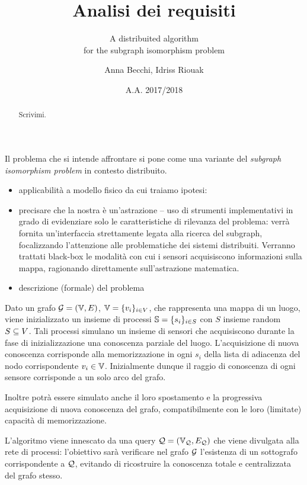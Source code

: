 \documentclass{llncs}
\subtitle{A distribuited algorithm\\for the subgraph isomorphism problem}
\title{Analisi dei requisiti}
\author{Anna Becchi, Idriss Riouak}
\institute{Laurea Magistrale in Informatica\\Universit\`a di Udine, Italy}
\date{A.A. 2017/2018}
\begin{document}
\maketitle
\begin{abstract}
  Scrivimi.
\end{abstract}

Il problema che si intende affrontare si pone come una variante del
\emph{subgraph isomorphism problem} in contesto distribuito.

\begin{itemize}
\item applicabilità a modello fisico da cui traiamo ipotesi:
\item precisare che la nostra è un'astrazione -- uso di strumenti
  implementativi in grado di evidenziare solo le caratteristiche
  di rilevanza del problema: verrà fornita un'interfaccia strettamente
  legata alla ricerca del subgraph, focalizzando l'attenzione
  alle problematiche dei sistemi distribuiti.
  Verranno trattati black-box le modalità con cui i sensori
  acquisiscono informazioni sulla mappa, ragionando direttamente
  sull'astrazione matematica.
\item descrizione (formale) del problema
\end{itemize}


Dato un grafo $\mathcal{G} = ( \mathbb{V}, E)$, $\mathbb{V} = \{v_i\}_{i \in V}$,
che rappresenta una mappa di un luogo, viene inizializzato un
insieme di processi $\mathbb{S} = \{s_i \}_{i \in S}$ con $S$ insieme
random $S \subseteq V$.
Tali processi simulano un insieme di sensori che
acquisiscono durante la fase di inizializzazione una conoscenza
parziale del luogo. L'acquisizione di nuova conoscenza corrisponde
alla memorizzazione in ogni $s_i$ della lista di adiacenza del nodo
corrispondente $v_i \in \mathbb{V}$.
Inizialmente dunque il raggio di conoscenza di ogni sensore corrisponde
a un solo arco del grafo.

Inoltre potrà essere simulato anche il loro spostamento e la progressiva
acquisizione di nuova conoscenza del grafo, compatibilmente con le
loro (limitate) capacità di memorizzazione.

L'algoritmo viene innescato da una query $\mathcal{Q} = (\mathbb{V}_{\mathcal{Q}}, E_{\mathcal{Q}})$
che viene divulgata alla rete di processi: l'obiettivo sarà verificare
nel grafo $\mathcal{G}$ l'esistenza di un sottografo corrispondente a $\mathcal{Q}$,
evitando di ricostruire la conoscenza totale e centralizzata del
grafo stesso.
\end{document}
